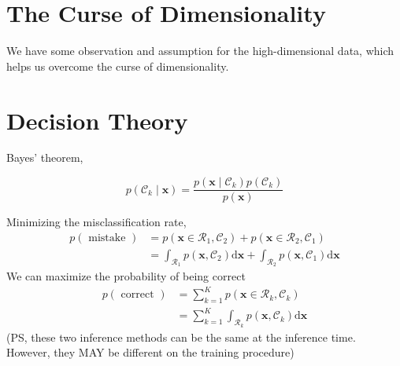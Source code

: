 \documentclass[11pt,en,cite=authoryear]{elegantpaper}
\begin{document}


\section{The Curse of Dimensionality}
We have some observation and assumption for the high-dimensional data, which helps us overcome the curse of dimensionality.


\section{Decision Theory}
Bayes’ theorem,

$$
p\left(\mathcal{C}_{k} \mid \mathbf{x}\right)=\frac{p\left(\mathbf{x} \mid \mathcal{C}_{k}\right) p\left(\mathcal{C}_{k}\right)}{p(\mathbf{x})}
$$

Minimizing the misclassiﬁcation rate,
$$
\begin{aligned}
p(\text { mistake }) &=p\left(\mathbf{x} \in \mathcal{R}_{1}, \mathcal{C}_{2}\right)+p\left(\mathbf{x} \in \mathcal{R}_{2}, \mathcal{C}_{1}\right) \\
&=\int_{\mathcal{R}_{1}} p\left(\mathbf{x}, \mathcal{C}_{2}\right) \mathrm{d} \mathbf{x}+\int_{\mathcal{R}_{2}} p\left(\mathbf{x}, \mathcal{C}_{1}\right) \mathrm{d} \mathbf{x}
\end{aligned}
$$
We can maximize the probability of being correct
$$
\begin{aligned}
p(\text { correct }) &=\sum_{k=1}^{K} p\left(\mathbf{x} \in \mathcal{R}_{k}, \mathcal{C}_{k}\right) \\
&=\sum_{k=1}^{K} \int_{\mathcal{R}_{k}} p\left(\mathbf{x}, \mathcal{C}_{k}\right) \mathrm{d} \mathbf{x}
\end{aligned}
$$
(PS, these two inference methods can be the same at the inference time.  However, they MAY be different on the training procedure)
\end{document}
